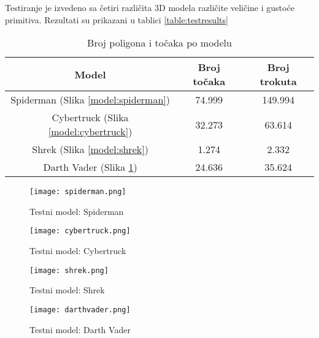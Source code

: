 Testiranje je izvedeno sa četiri različita 3D modela različite veličine i gustoće primitiva.
Rezultati su prikazani u tablici \ref{table:testresults}

\begin{table}[h!]
    \begin{center}
      \begin{tabular}{ | c | c | c | }
        \hline
        \textbf{Model} & \textbf{Broj točaka} & \textbf{Broj trokuta} \\
        \hline
         Spiderman (Slika \ref{model:spiderman}) & 74.999 & 149.994 \\
        \hline
         Cybertruck (Slika \ref{model:cybertruck}) & 32.273 & 63.614 \\
        \hline
         Shrek (Slika \ref{model:shrek}) & 1.274 & 2.332 \\
        \hline
         Darth Vader (Slika \ref{model:darthvader}) & 24.636 & 35.624 \\
        \hline
      \end{tabular}
    \end{center}
  \caption{Broj poligona i točaka po modelu}
  \label{table:poly}
\end{table}

\begin{figure}
    \centering
    \begin{minipage}[b]{0.4\textwidth}
        \texttt{[image: spiderman.png]}
        \caption {Testni model: Spiderman}
        \label{model:spiderman}
    \end{minipage}
    \begin{minipage}[b]{0.4\textwidth}
        \texttt{[image: cybertruck.png]}
        \caption {Testni model: Cybertruck}
        \label{model:cybertruck}
    \end{minipage}
    \begin{minipage}[b]{0.4\textwidth}
        \texttt{[image: shrek.png]}
        \caption {Testni model: Shrek}
        \label{model:shrek}
    \end{minipage}
    \begin{minipage}[b]{0.4\textwidth}
        \texttt{[image: darthvader.png]}
        \caption {Testni model: Darth Vader}
        \label{model:darthvader}
    \end{minipage}
\end{figure}

